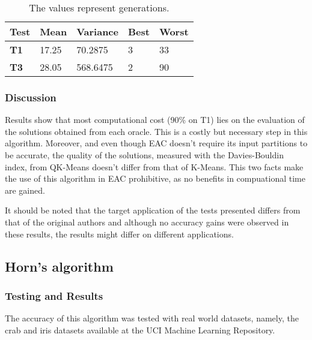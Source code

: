 
\begin{table}[h]
\caption{The values represent generations.}
\begin{tabular}{|l|l|l|l|l|}
\hline
\textbf{Test} & \textbf{Mean} & \textbf{Variance} & \textbf{Best} & \textbf{Worst} \\ \hline
\textbf{T1}   & 17.25         & 70.2875           & 3             & 33             \\ \hline
\textbf{T3}   & 28.05         & 568.6475          & 2             & 90             \\ \hline
\end{tabular}
\label{tab:db_index_t1_t3}
\end{table}

\subsubsection{Discussion}

Results show that most computational cost (90\% on T1) lies on the evaluation of the solutions obtained from each oracle. This is a costly but necessary step in this algorithm. Moreover, and even though EAC doesn't require its input partitions to be accurate, the quality of the solutions, measured with the Davies-Bouldin index, from QK-Means doesn't differ from that of K-Means. This two facts make the use of this algorithm in EAC prohibitive, as no benefits in compuational time are gained.

It should be noted that the target application of the tests presented differs from that of the original authors and although no accuracy gains were observed in these results, the results might differ on different applications.

\subsection{Horn's algorithm}


\subsubsection{Testing and Results}




The accuracy of this algorithm was tested with real world datasets, namely, the crab and iris datasets available at the UCI Machine Learning Repository.

